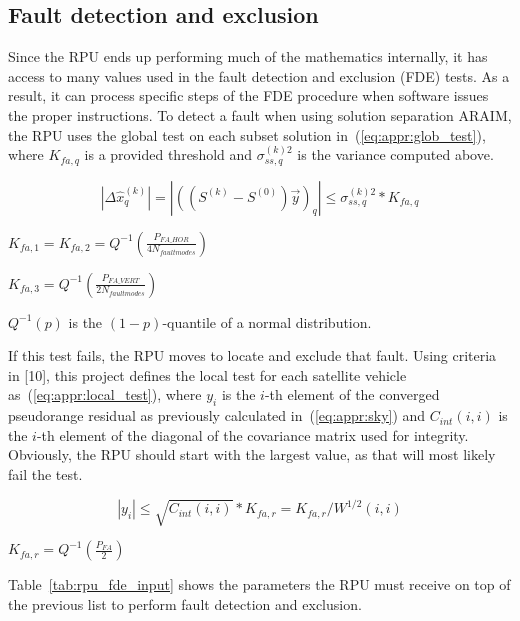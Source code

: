 \documentclass[11pt]{article}
\begin{document}
\subsection{Fault detection and exclusion}

Since the RPU ends up performing much of the mathematics internally, it has access to many values used in the fault detection and exclusion (FDE) tests. As a result, it can process specific steps of the FDE procedure when software issues the proper instructions. To detect a fault when using solution separation ARAIM, the RPU uses the global test on each subset solution in~(\ref{eq:appr:glob_test}), where $K_{fa,q}$ is a provided threshold and $\sigma_{ss,q}^{(k)2}$ is the variance computed above.

\begin{equation}
    \label{eq:appr:glob_test}
    |\Delta \hat{x}^{(k)}_q| = |((S^{(k)} - S^{(0)})\vec{y})_q| \le \sigma_{ss,q}^{(k)2} * K_{fa,q}
\end{equation}

$K_{fa,1} = K_{fa,2} = Q^{-1}(\frac{P_{FA\_HOR}}{4N_{fault modes}})$

$K_{fa,3} = Q^{-1}(\frac{P_{FA\_VERT}}{2N_{fault modes}})$

$Q^{-1}(p)$ is the $(1-p)$-quantile of a normal distribution.

If this test fails, the RPU moves to locate and exclude that fault. Using criteria in [10], this project defines the local test for each satellite vehicle as~(\ref{eq:appr:local_test}), where $y_i$ is the $i$-th element of the converged pseudorange residual as previously calculated in~(\ref{eq:appr:sky}) and $C_{int}(i,i)$ is the $i$-th element of the diagonal of the covariance matrix used for integrity. Obviously, the RPU should start with the largest value, as that will most likely fail the test.

\begin{equation}
    \label{eq:appr:local_test}
    |y_i| \le \sqrt{C_{int}(i,i)} * K_{fa,r} = K_{fa,r} / W^{1/2}(i,i)
\end{equation}

$K_{fa,r} = Q^{-1}(\frac{P_{FA}}{2})$

Table~\ref{tab:rpu_fde_input} shows the parameters the RPU must receive on top of the previous list to perform fault detection and exclusion.
\end{document}
